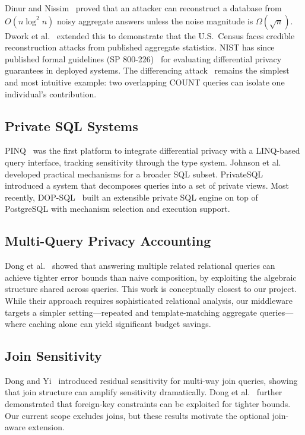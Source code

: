 \documentclass[sigconf,nonacm]{acmart}
\begin{document}
Dinur and Nissim~\cite{dinur2003revealing} proved that an attacker can reconstruct a database from $O(n \log^2 n)$ noisy aggregate answers unless the noise magnitude is $\Omega(\sqrt{n})$. Dwork et al.~\cite{dwork2017exposed} extended this to demonstrate that the U.S.\ Census faces credible reconstruction attacks from published aggregate statistics. NIST has since published formal guidelines (SP 800-226)~\cite{nist2025sp800226} for evaluating differential privacy guarantees in deployed systems. The differencing attack~\cite{denning1979tracker} remains the simplest and most intuitive example: two overlapping COUNT queries can isolate one individual's contribution.

\subsection{Private SQL Systems}

PINQ~\cite{mcsherry2009privacy} was the first platform to integrate differential privacy with a LINQ-based query interface, tracking sensitivity through the type system. Johnson et al.~\cite{johnson2018towards} developed practical mechanisms for a broader SQL subset. PrivateSQL~\cite{kotsogiannis2019privatesql} introduced a system that decomposes queries into a set of private views. Most recently, DOP-SQL~\cite{yu2024dopsql} built an extensible private SQL engine on top of PostgreSQL with mechanism selection and execution support.

\subsection{Multi-Query Privacy Accounting}

Dong et al.~\cite{dong2023better} showed that answering multiple related relational queries can achieve tighter error bounds than naive composition, by exploiting the algebraic structure shared across queries. This work is conceptually closest to our project. While their approach requires sophisticated relational analysis, our middleware targets a simpler setting---repeated and template-matching aggregate queries---where caching alone can yield significant budget savings.

\subsection{Join Sensitivity}

Dong and Yi~\cite{dong2021residual} introduced residual sensitivity for multi-way join queries, showing that join structure can amplify sensitivity dramatically. Dong et al.~\cite{dong2022r2t} further demonstrated that foreign-key constraints can be exploited for tighter bounds. Our current scope excludes joins, but these results motivate the optional join-aware extension.
\end{document}
